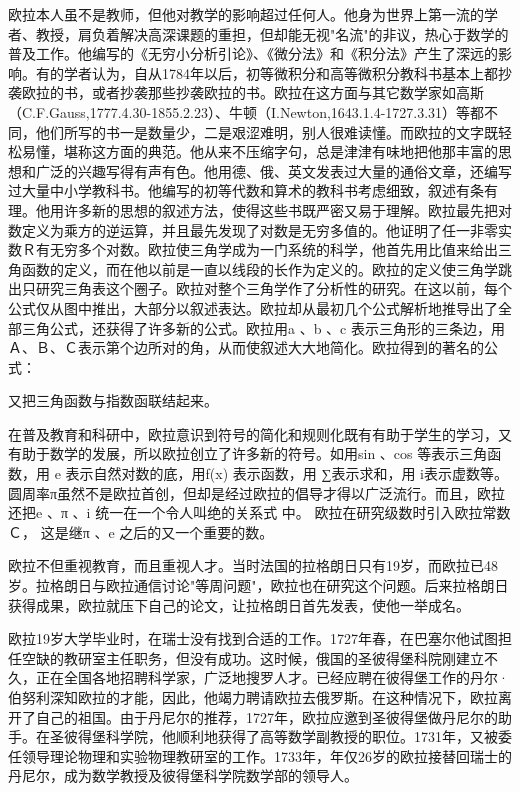 \documentclass[UTF8]{ctexart}
\begin{document}
欧拉本人虽不是教师，但他对教学的影响超过任何人。他身为世界上第一流的学者、教授，肩负着解决高深课题的重担，但却能无视"名流"的非议，热心于数学的普及工作。他编写的《无穷小分析引论》、《微分法》和《积分法》产生了深远的影响。有的学者认为，自从1784年以后，初等微积分和高等微积分教科书基本上都抄袭欧拉的书，或者抄袭那些抄袭欧拉的书。欧拉在这方面与其它数学家如高斯（C.F.Gauss,1777.4.30-1855.2.23）、牛顿（I.Newton,1643.1.4-1727.3.31）等都不同，他们所写的书一是数量少，二是艰涩难明，别人很难读懂。而欧拉的文字既轻松易懂，堪称这方面的典范。他从来不压缩字句，总是津津有味地把他那丰富的思想和广泛的兴趣写得有声有色。他用德、俄、英文发表过大量的通俗文章，还编写过大量中小学教科书。他编写的初等代数和算术的教科书考虑细致，叙述有条有理。他用许多新的思想的叙述方法，使得这些书既严密又易于理解。欧拉最先把对数定义为乘方的逆运算，并且最先发现了对数是无穷多值的。他证明了任一非零实数Ｒ有无穷多个对数。欧拉使三角学成为一门系统的科学，他首先用比值来给出三角函数的定义，而在他以前是一直以线段的长作为定义的。欧拉的定义使三角学跳出只研究三角表这个圈子。欧拉对整个三角学作了分析性的研究。在这以前，每个公式仅从图中推出，大部分以叙述表达。欧拉却从最初几个公式解析地推导出了全部三角公式，还获得了许多新的公式。欧拉用a 、b 、c 表示三角形的三条边，用Ａ、Ｂ、Ｃ表示第个边所对的角，从而使叙述大大地简化。欧拉得到的著名的公式：

又把三角函数与指数函联结起来。

在普及教育和科研中，欧拉意识到符号的简化和规则化既有有助于学生的学习，又有助于数学的发展，所以欧拉创立了许多新的符号。如用sin 、cos 等表示三角函数，用 e 表示自然对数的底，用f(x) 表示函数，用 ∑表示求和，用 i表示虚数等。圆周率π虽然不是欧拉首创，但却是经过欧拉的倡导才得以广泛流行。而且，欧拉还把e 、π 、i 统一在一个令人叫绝的关系式 中。 欧拉在研究级数时引入欧拉常数Ｃ， 这是继π 、e 之后的又一个重要的数。

欧拉不但重视教育，而且重视人才。当时法国的拉格朗日只有19岁，而欧拉已48岁。拉格朗日与欧拉通信讨论"等周问题"，欧拉也在研究这个问题。后来拉格朗日获得成果，欧拉就压下自己的论文，让拉格朗日首先发表，使他一举成名。

欧拉19岁大学毕业时，在瑞士没有找到合适的工作。1727年春，在巴塞尔他试图担任空缺的教研室主任职务，但没有成功。这时候，俄国的圣彼得堡科院刚建立不久，正在全国各地招聘科学家，广泛地搜罗人才。已经应聘在彼得堡工作的丹尔·伯努利深知欧拉的才能，因此，他竭力聘请欧拉去俄罗斯。在这种情况下，欧拉离开了自己的祖国。由于丹尼尔的推荐，1727年，欧拉应邀到圣彼得堡做丹尼尔的助手。在圣彼得堡科学院，他顺利地获得了高等数学副教授的职位。1731年，又被委任领导理论物理和实验物理教研室的工作。1733年，年仅26岁的欧拉接替回瑞士的丹尼尔，成为数学教授及彼得堡科学院数学部的领导人。
\end{document}
